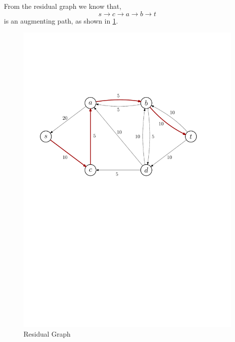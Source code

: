\documentclass[12pt,letterpaper,titlepage,en-US]{article}
\begin{document}
\begin{homeworkProblem}
\begin{homeworkSubProblem}
\end{homeworkSubProblem}
\begin{homeworkSubProblem}
From the residual graph we know that,
\[s \longrightarrow c \longrightarrow a \longrightarrow b \longrightarrow t\]
is an augmenting path, as shown in \cref{p3b}.
\begin{figure}[H]
    \caption{Residual Graph}\label{p3b}
    \centering
    \includegraphics[width=.7\textwidth]{p3b}
\end{figure}


\end{homeworkSubProblem}
\end{homeworkProblem}
\end{document}
